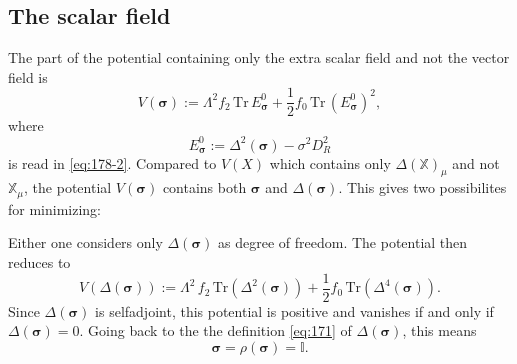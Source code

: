 \documentclass[11pt]{article}
\newcommand{\sig}{{\boldsymbol{\sigma}}}
\newcommand{\XX}{{\mathbb X}}
\begin{document}
 \subsection{The scalar field}
 \label{section:potentialsigma}

The part of the potential containing only the extra scalar field
and not the vector field  is 
\begin{equation}
  \label{eq:170}
    V(\sig):= \Lambda^2 f_2 \,\text{Tr}\, E^0_\sig +  \frac 12 f_0 \,\text{Tr}\, (E_\sig^0)^2,
\end{equation}
where
\begin{equation}
E_\sig^0 := \Delta^2(\sig)-\sigma^2D_R^2
\label{eq:65}
\end{equation}
is read in
\eqref{eq:178-2}. Compared to $V(X)$ which contains only
$\Delta(\XX)_\mu$ and not $\XX_\mu$, the potential $V(\sig)$ contains both $\sig$
and $\Delta(\sig)$. This gives two possibilites for minimizing:

Either one considers only $\Delta(\sig)$ as degree of freedom. The
potential then reduces to
\begin{equation}
  \label{eq:197}
  V(\Delta(\sig)):= \Lambda^2\, f_2\,\text{Tr}(\Delta^2(\sig)) + \frac 12 f_0\,\text{Tr}(\Delta^4(\sig)).
\end{equation}
Since $\Delta(\sig)$ is selfadjoint, this potential is positive and
vanishes if and only if $\Delta(\sig) = 0$. Going back to the the definition \eqref{eq:171} 
of $\Delta(\sig)$, this means
 \begin{equation}
\sig = \rho({\sig}) =
  \mathbb I.\label{eq:131}
  \end{equation}
\end{document}
